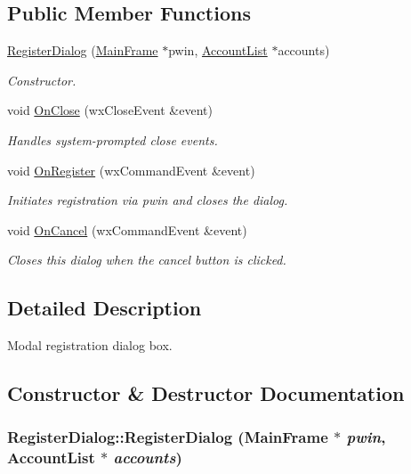 \subsection*{Public Member Functions}
\begin{CompactItemize}
\item 
\hyperlink{classRegisterDialog_b07d91afc6ed60fd752ee324c322e2d8}{RegisterDialog} (\hyperlink{classMainFrame}{MainFrame} $\ast$pwin, \hyperlink{classAccountList}{AccountList} $\ast$accounts)
\begin{CompactList}\small\item\em Constructor. \item\end{CompactList}\item 
void \hyperlink{classRegisterDialog_6c95acf152a19de81ab996dcef977827}{OnClose} (wxCloseEvent \&event)
\begin{CompactList}\small\item\em Handles system-prompted close events. \item\end{CompactList}\item 
void \hyperlink{classRegisterDialog_334ccf10990ab1ec905088ea69187c2b}{OnRegister} (wxCommandEvent \&event)
\begin{CompactList}\small\item\em Initiates registration via pwin and closes the dialog. \item\end{CompactList}\item 
void \hyperlink{classRegisterDialog_3389f6b8e9ec03901de4f5424d8ea201}{OnCancel} (wxCommandEvent \&event)
\begin{CompactList}\small\item\em Closes this dialog when the cancel button is clicked. \item\end{CompactList}\end{CompactItemize}


\subsection{Detailed Description}
Modal registration dialog box. 



\subsection{Constructor \& Destructor Documentation}
\hypertarget{classRegisterDialog_b07d91afc6ed60fd752ee324c322e2d8}{
\subsubsection[{RegisterDialog}]{\setlength{\rightskip}{0pt plus 5cm}RegisterDialog::RegisterDialog ({\bf MainFrame} $\ast$ {\em pwin}, \/  {\bf AccountList} $\ast$ {\em accounts})}}
\label{classRegisterDialog_b07d91afc6ed60fd752ee324c322e2d8}


